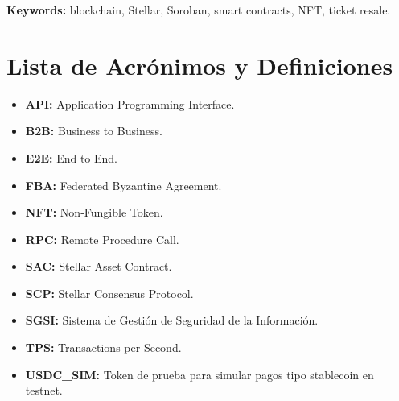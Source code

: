 \textbf{Keywords:} blockchain, Stellar, Soroban, smart contracts, NFT, ticket resale.

\newpage
\section{Lista de Acrónimos y Definiciones}

\begin{itemize}
	\item \textbf{API:} Application Programming Interface.
	\item \textbf{B2B:} Business to Business.
	\item \textbf{E2E:} End to End.
	\item \textbf{FBA:} Federated Byzantine Agreement.
	\item \textbf{NFT:} Non-Fungible Token.
	\item \textbf{RPC:} Remote Procedure Call.
	\item \textbf{SAC:} Stellar Asset Contract.
	\item \textbf{SCP:} Stellar Consensus Protocol.
	\item \textbf{SGSI:} Sistema de Gestión de Seguridad de la Información.
	\item \textbf{TPS:} Transactions per Second.
	\item \textbf{USDC\_SIM:} Token de prueba para simular pagos tipo stablecoin en testnet.
\end{itemize}



